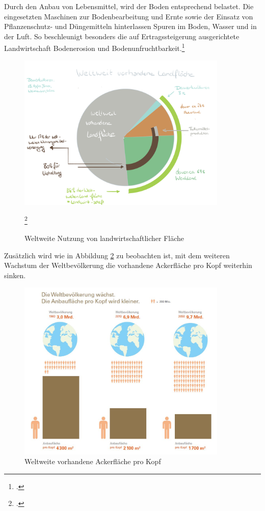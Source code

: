 \documentclass{scrartcl}
\begin{document}
Durch den Anbau von Lebensmittel, wird der Boden entsprechend belastet. Die eingesetzten Maschinen zur Bodenbearbeitung und Ernte sowie der Einsatz von Pflanzenschutz- und Düngemitteln hinterlassen Spuren im Boden, Wasser und in der Luft. So beschleunigt besonders die auf Ertragssteigerung ausgerichtete Landwirtschaft Bodenerosion und Bodenunfruchtbarkeit.\footcite{UmweltbelastungenUmweltbundesamt}
\begin{figure}[htbp]
\centering
\includegraphics[width=10cm]{image_folder/LFlaeche.png}
\caption{Weltweite Nutzung von landwirtschaftlicher Fläche}
\label{fig:lFlaeche}\footcite[Eigene Darstellung in Anlehnung an]{2008FAOSTAT}
\end{figure}

Zusätzlich wird wie in Abbildung \ref{fig:AckerproKopf} zu beobachten ist, mit dem weiteren Wachstum der Weltbevölkerung die vorhandene Ackerfläche pro Kopf weiterhin sinken. 
\begin{figure}[htbp]
\centering
\includegraphics[width=10cm]{image_folder/weltbevoelkerung_anbauflaeche_pro_kopf.jpg}
\caption{Weltweite vorhandene Ackerfläche pro Kopf}
\label{fig:AckerproKopf}
\end{figure}
\end{document}
